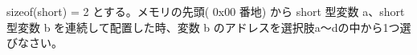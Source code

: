 sizeof(short) = 2 とする。メモリの先頭( 0x00 番地) から short 型変数 a、short 型変数 b を連続して配置した時、変数 b のアドレスを選択肢a〜dの中から1つ選びなさい。

